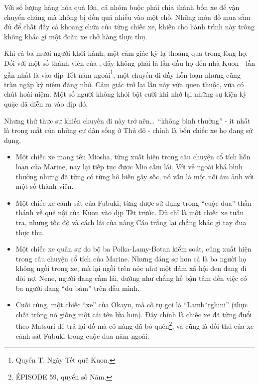 \documentclass[../main.tex]{subfiles}
\begin{document}
\color{black}


Với số lượng hàng hóa quá lớn, cả nhóm buộc phải chia thành bốn xe để vận chuyển chúng mà không bị dồn quá nhiều vào một chỗ. Những món đồ mua sắm đủ để chất đầy cả khoang chứa của từng chiếc xe, khiến cho hành trình này trông không khác gì một đoàn xe chở hàng thực thụ.

Khi cả ba mươi người khởi hành, một cảm giác kỳ lạ thoáng qua trong lòng họ. Đối với một số thành viên của \hll, đây không phải là lần đầu họ đến nhà Kuon - lần gần nhất là vào dịp Tết năm ngoái\footnote{Quyển T: Ngày Tết quê Kuon.}, một chuyến đi đầy hỗn loạn nhưng cũng tràn ngập kỷ niệm đáng nhớ. Cảm giác trở lại lần này vừa quen thuộc, vừa có chút hoài niệm. Một số người không khỏi bật cười khi nhớ lại những sự kiện kỳ quặc đã diễn ra vào dịp đó.

Nhưng thứ thực sự khiến chuyến đi này trở nên\dots\ ``không bình thường'' - ít nhất là trong mắt của những cư dân sống ở Thủ đô - chính là bốn chiếc xe họ đang sử dụng.

\begin{itemize}
    \item Một chiếc xe mang tên Miosha, từng xuất hiện trong câu chuyện cổ tích hỗn loạn của Marine, nay lại tiếp tục được Mio cầm lái. Với vẻ ngoài khá bình thường nhưng đã từng có từng hô biến gây sốc, nó vẫn là một nỗi ám ảnh với một số thành viên.
    \item Một chiếc xe cảnh sát của Fubuki, từng được sử dụng trong ``cuộc đua'' thần thánh về quê nội của Kuon vào dịp Tết trước. Dù chỉ là một chiếc xe tuần tra, nhưng tốc độ và cách lái của nàng Cáo trắng lại chẳng khác gì tay đua thực thụ.
    \item Một chiếc xe quân sự do bộ ba Polka-Lamy-Botan kiểm soát, cũng xuất hiện trong câu chuyện cổ tích của Marine. Nhưng đáng sợ hơn cả là ba người họ không ngồi trong xe, mà lại ngồi trên nóc như một đám xã hội đen đang đi đòi nợ. Nene, người đang cầm lái, dường như chẳng hề bận tâm đến việc có ba người đang ``đu bám'' trên đầu mình.
    \item Cuối cùng, một chiếc ``xe'' của Okayu, mà cô tự gọi là ``Lamb*rghini'' (thực chất trông nó giống một cái tên lửa hơn). Đây chính là chiếc xe đã từng đuổi theo Matsuri để trả lại đồ mà cô nàng đã bỏ quên\footnote{{\flaregothic ÉPISODE 59}, quyển số Năm.}, và cũng là đối thủ của xe cảnh sát Fubuki trong cuộc đua năm ngoái.
\end{itemize}
\end{document}
